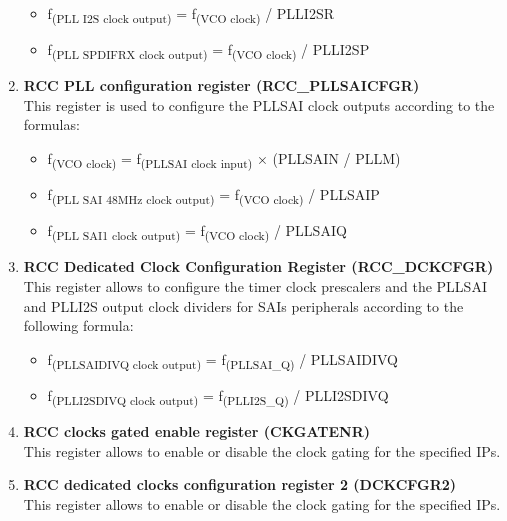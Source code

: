 \documentclass[12pt]{article}
\begin{document}
\begin{enumerate}
\begin{itemize}
            \item f\textsubscript{(PLL I2S clock output)} = f\textsubscript{(VCO clock)} / PLLI2SR
            \item f\textsubscript{(PLL SPDIFRX clock output)} = f\textsubscript{(VCO clock)} / PLLI2SP
        \end{itemize}
    \item \textbf{RCC PLL configuration register (RCC\_PLLSAICFGR)}
        \\ This register is used to configure the PLLSAI clock outputs according to the formulas:
        \begin{itemize}
            \item f\textsubscript{(VCO clock)} = f\textsubscript{(PLLSAI clock input)} × (PLLSAIN / PLLM)
            \item f\textsubscript{(PLL SAI 48MHz clock output)} = f\textsubscript{(VCO clock)} / PLLSAIP
            \item f\textsubscript{(PLL SAI1 clock output)} = f\textsubscript{(VCO clock)} / PLLSAIQ
        \end{itemize}
    \item \textbf{RCC Dedicated Clock Configuration Register (RCC\_DCKCFGR)}
        \\ This register allows to configure the timer clock prescalers and the PLLSAI and PLLI2S output clock dividers for SAIs peripherals according to the following formula:
        \begin{itemize}
            \item f\textsubscript{(PLLSAIDIVQ clock output)} = f\textsubscript{(PLLSAI\_Q)} / PLLSAIDIVQ
            \item f\textsubscript{(PLLI2SDIVQ clock output)} = f\textsubscript{(PLLI2S\_Q)} / PLLI2SDIVQ
        \end{itemize}
    \item \textbf{RCC clocks gated enable register (CKGATENR)}
        \\ This register allows to enable or disable the clock gating for the specified IPs.
    \item \textbf{RCC dedicated clocks configuration register 2 (DCKCFGR2)}
        \\ This register allows to enable or disable the clock gating for the specified IPs.
\end{enumerate}
\end{document}
